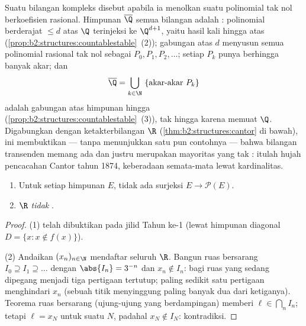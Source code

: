 \begin{example}\label{ex:b2:structures:algebraic}
Suatu bilangan kompleks disebut \emph{} apabila ia menolkan
suatu polinomial tak nol berkoefisien rasional. Himpunan
$\overline\Q$ semua bilangan  adalah : polinomial
berderajat $\leq d$ atas $\Q$ terinjeksi ke $\Q^{d+1}$, yaitu hasil
kali hingga atas 
(\cref{prop:b2:structures:countablestable}~(2)); gabungan atas
$d$ menyusun semua polinomial rasional tak nol sebagai $P_0, P_1,
P_2, \dots$; setiap $P_k$ punya berhingga banyak akar; dan
\[
\overline\Q = \bigcup_{k \in \N}\ \{\text{akar-akar } P_k\}
\]
adalah gabungan  atas himpunan hingga
(\cref{prop:b2:structures:countablestable}~(3)), tak hingga karena
memuat $\Q$. Digabungkan dengan ketakterbilangan $\R$
(\cref{thm:b2:structures:cantor} di bawah), ini membuktikan ---
tanpa menunjukkan satu pun contohnya --- bahwa bilangan transenden
memang ada dan justru merupakan mayoritas yang tak :
itulah hujah pencacahan Cantor tahun 1874, keberadaan semata-mata
lewat kardinalitas.
\end{example}

\begin{theorem}\label{thm:b2:structures:cantor}
\begin{enumerate}
  \item Untuk setiap himpunan $E$, tidak ada surjeksi $E \to
        \mathcal{P}(E)$.
  \item $\R$ \emph{tidak} .
\end{enumerate}
\end{theorem}

\begin{proof}
(1) telah dibuktikan pada jilid Tahun ke-1 (lewat himpunan diagonal $D =
\{x : x \notin f(x)\}$).

(2) Andaikan $(x_n)_{n \in \N}$ mendaftar seluruh $\R$. Bangun ruas
bersarang $I_0 \supseteq I_1 \supseteq \dots$ dengan $\abs{I_n} = 3^{-n}$
dan $x_n \notin I_n$: bagi ruas yang sedang dipegang menjadi tiga
pertigaan tertutup; paling sedikit satu pertigaan menghindari $x_n$
(sebuah titik menyinggung paling banyak dua dari ketiganya). Teorema
ruas bersarang (ujung-ujung yang berdampingan) memberi $\ell \in
\bigcap_n I_n$; tetapi $\ell = x_N$ untuk suatu $N$, padahal $x_N
\notin I_N$: kontradiksi.
\end{proof}

